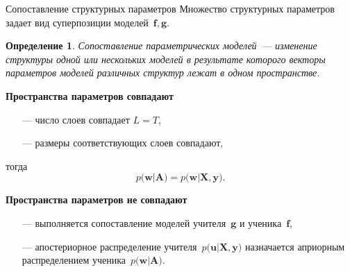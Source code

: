 \documentclass[10pt,pdf,hyperref={unicode}]{beamer}
\newtheorem{rusdefinition}{Определение}
\begin{document}
\begin{frame}{Сопоставление структурных параметров}
Множество структурных параметров задает вид суперпозиции моделей~$\mathbf{f}, \mathbf{g}$.

\begin{rusdefinition}
Сопоставление параметрических моделей~--- изменение структуры одной или нескольких моделей в результате которого векторы параметров моделей различных структур лежат в одном пространстве.
\end{rusdefinition}


\textbf{Пространства параметров совпадают}
\begin{itemize}
    \item[---] число слоев совпадает $L=T$,
    \item[---] размеры соответствующих слоев совпадают,
\end{itemize}
тогда
\[
p\bigr(\textbf{w}|\textbf{A}\bigr) = p\bigr(\textbf{w}|\textbf{X}, \textbf{y}\bigr).
\]

\textbf{Пространства параметров не совпадают}
\begin{itemize}
    \item[---] выполняется сопоставление моделей учителя~$\textbf{g}$ и ученика~$\textbf{f}$,
    \item[---] апостериорное распределение учителя~$p\bigr(\textbf{u}|\textbf{X}, \textbf{y}\bigr)$ назначается априорным распределением ученика~$p\bigr(\textbf{w}|\textbf{A}\bigr)$.
\end{itemize}

\end{frame}
\end{document}
